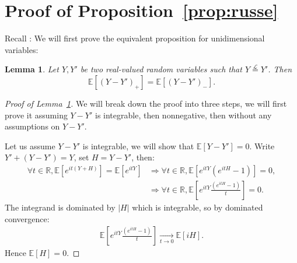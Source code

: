 \documentclass[11pt]{article}
\newtheorem{lemma}[prop]{Lemma}
\begin{document}
\section{Proof of Proposition~\ref{prop:russe}}\label{sec:Appendix}

Recall :
\proprusse*
We will first prove the equivalent proposition for unidimensional variables:
\begin{lemma}
    \label{prop:russeuni}
    Let $Y,Y'$ be two real-valued random variables such that $Y\overset{\mathcal{L}}{=}Y'$.
    Then \[ \mathbb{E}[(Y-Y')_+]=\mathbb{E}[(Y-Y')_-]. \]
\end{lemma}

\begin{proof}[Proof of Lemma~\ref{prop:russeuni}]
We will break down the proof into three steps, we will first prove it assuming $Y-Y'$ is integrable, then nonnegative, then without any assumptions on $Y-Y'$.

Let us assume $Y-Y'$ is integrable, we will show that $\mathbb{E}[Y-Y']=0$.
    Write $Y'+(Y-Y')=Y$, set $H=Y-Y'$, then:
    \begin{align*}
        \forall t \in \mathbb{R}, \mathbb{E}\left[ e^{it(Y+H)}\right]=\mathbb{E}\left[ e^{itY}\right] 
        &\Rightarrow \forall t \in \mathbb{R}, \mathbb{E}\left[ e^{itY} \left(e^{itH}-1\right) \right]=0, \\
        &\Rightarrow \forall t \in \mathbb{R}, \mathbb{E}\left[ e^{itY} \frac{\left(e^{itH}-1\right)}{t} \right]=0.
    \end{align*}
    The integrand is dominated by $|H|$ which is integrable, so by dominated convergence:
    \begin{align*}
        \mathbb{E}\left[ e^{itY} \frac{\left(e^{itH}-1\right)}{t} \right] \underset{t \rightarrow 0}{ \rightarrow} \mathbb{E}[iH].
    \end{align*}
    Hence $\mathbb{E}[H]=0$.


\end{proof}
\end{document}
